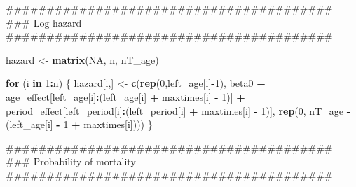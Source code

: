\documentclass[11pt,]{article}
\newenvironment{Shaded}{\begin{snugshade}}{\end{snugshade}}
\newcommand{\KeywordTok}[1]{\textcolor[rgb]{0.13,0.29,0.53}{\textbf{#1}}}
\newcommand{\DecValTok}[1]{\textcolor[rgb]{0.00,0.00,0.81}{#1}}
\newcommand{\StringTok}[1]{\textcolor[rgb]{0.31,0.60,0.02}{#1}}
\newcommand{\OtherTok}[1]{\textcolor[rgb]{0.56,0.35,0.01}{#1}}
\newcommand{\ControlFlowTok}[1]{\textcolor[rgb]{0.13,0.29,0.53}{\textbf{#1}}}
\newcommand{\OperatorTok}[1]{\textcolor[rgb]{0.81,0.36,0.00}{\textbf{#1}}}
\newcommand{\NormalTok}[1]{#1}
\begin{document}
\begin{Shaded}
\begin{Highlighting}[]
\NormalTok{  ########################################}
\NormalTok{  ### Log hazard}
\NormalTok{  ########################################}

\NormalTok{  hazard <-}\StringTok{ }\KeywordTok{matrix}\NormalTok{(}\OtherTok{NA}\NormalTok{, n, nT_age)}

  \ControlFlowTok{for}\NormalTok{ (i }\ControlFlowTok{in} \DecValTok{1}\OperatorTok{:}\NormalTok{n) \{}
\NormalTok{    hazard[i,] <-}\StringTok{ }\KeywordTok{c}\NormalTok{(}\KeywordTok{rep}\NormalTok{(}\DecValTok{0}\NormalTok{,left_age[i]}\OperatorTok{-}\DecValTok{1}\NormalTok{), beta0 }\OperatorTok{+}
\StringTok{                      }\NormalTok{age_effect[left_age[i]}\OperatorTok{:}\NormalTok{(left_age[i] }\OperatorTok{+}\StringTok{ }\NormalTok{maxtimes[i] }\OperatorTok{-}\StringTok{ }\DecValTok{1}\NormalTok{)] }\OperatorTok{+}
\StringTok{                      }\NormalTok{period_effect[left_period[i]}\OperatorTok{:}\NormalTok{(left_period[i] }\OperatorTok{+}\StringTok{ }\NormalTok{maxtimes[i] }\OperatorTok{-}\StringTok{ }\DecValTok{1}\NormalTok{)],}
                      \KeywordTok{rep}\NormalTok{(}\DecValTok{0}\NormalTok{, nT_age }\OperatorTok{-}\StringTok{ }\NormalTok{(left_age[i] }\OperatorTok{-}\StringTok{ }\DecValTok{1} \OperatorTok{+}\StringTok{ }\NormalTok{maxtimes[i])))}
\NormalTok{  \}}

\NormalTok{  ########################################}
\NormalTok{  ### Probability of mortality}
\NormalTok{  ########################################}


\end{Highlighting}
\end{Shaded}
\end{document}
